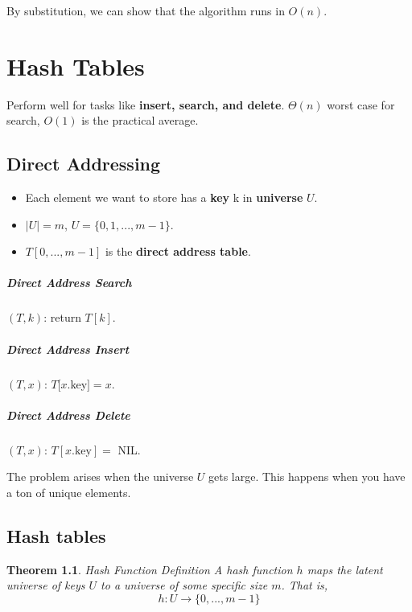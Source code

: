 \documentclass[a4paper,12pt]{report}
\newtheorem{theorem}{Theorem}
\begin{document}
By substitution, we can show that the algorithm runs in $O(n)$.











\chapter{Hash Tables}

Perform well for tasks like \textbf{insert, search, and delete}. $\Theta(n)$ worst case for search, $O(1)$ is the practical average. 

\section{Direct Addressing}

\begin{itemize}
\item Each element we want to store has a \textbf{key} k in \textbf{universe} $U$.
\item $|U| = m$, $U = \{0, 1, ..., m-1\}$.
\item $T[0,...,m-1]$ is the \textbf{direct address table}.
\end{itemize}

\paragraph{Direct Address Search}$(T,k)$: return $T[k]$. 

\paragraph{Direct Address Insert}$(T,x)$: $T[x$.key$]=x$.

\paragraph{Direct Address Delete}$(T, x)$: $T[x.\text{key}] =$ NIL.

The problem arises when the universe $U$ gets large. This happens when you have a ton of unique elements. 


\section{Hash tables}

\begin{theorem}{Hash Function Definition}
A hash function $h$ maps the latent universe of keys $U$ to a universe of some specific size $m$. That is,
\begin{equation}
h:U\to \{0,..., m-1\}
\end{equation}
\end{theorem}
\end{document}
